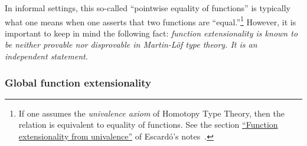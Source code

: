 \ccpad
In informal settings, this so-called ``pointwise equality of functions'' is typically what one means when one
asserts that two functions are ``equal.''\footnote{%
If one assumes the \emph{univalence axiom} of Homotopy Type Theory, then the  relation is equivalent to equality of functions. See the section \href{https://www.cs.bham.ac.uk/~mhe/HoTT-UF-in-Agda-Lecture-Notes/HoTT-UF-Agda.html\#funextfromua}{``Function extensionality from univalence''} of Escard\'o's notes~\cite{MHE}.}
However, it is important to keep in mind the following fact: \textit{function extensionality is known to be neither provable nor disprovable in Martin-Löf type theory. It is an independent statement}.~\cite{MHE}

\subsubsection{Global function extensionality}\label{sec:glob-funct-extens}

